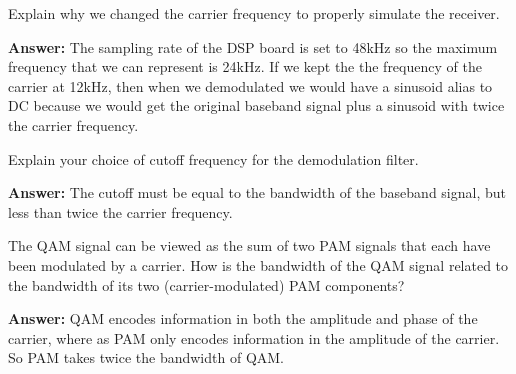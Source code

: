 \documentclass{article}
\begin{document}
\begin{enumerate}
  \begin{item}
    Explain why we changed the carrier frequency to properly simulate the receiver. 

  \textbf{Answer:}
    The sampling rate of the DSP board is set to 48kHz so the maximum frequency that we can represent is 24kHz.
    If we kept the the frequency of the carrier at 12kHz, then when we demodulated we would have a sinusoid alias to DC
    because we would get the original baseband signal plus a sinusoid with twice the carrier frequency.
  \end{item}

  \begin{item}
    Explain your choice of cutoff frequency for the demodulation filter.

  \textbf{Answer:}
    The cutoff must be equal to the bandwidth of the baseband signal, but less than twice the carrier frequency.
  \end{item}

  \begin{item}
    The QAM signal can be viewed as the sum of two PAM signals that each have been modulated by a carrier. How is the bandwidth of the QAM signal related to the bandwidth of its two (carrier-modulated) PAM components?

  \textbf{Answer:}
    QAM encodes information in both the amplitude and phase of the carrier, where as PAM only encodes information in the amplitude of the carrier.
    So PAM takes twice the bandwidth of QAM.

  \end{item}
\end{enumerate}
\end{document}

